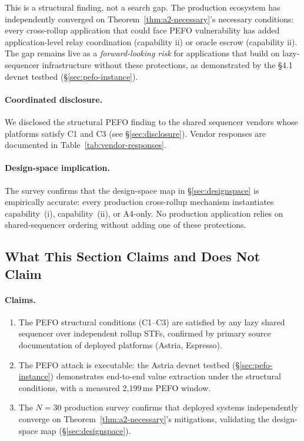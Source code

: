 This is a structural finding, not a search gap. The production ecosystem has
independently converged on Theorem~\ref{thm:a2-necessary}'s necessary
conditions: every cross-rollup application that could face PEFO vulnerability
has added application-level relay coordination (capability ii) or oracle
escrow (capability ii). The gap remains live as a \emph{forward-looking risk}
for applications that build on lazy-sequencer infrastructure without these
protections, as demonstrated by the §4.1 devnet testbed (\S\ref{sec:pefo-instance}).

\paragraph{Coordinated disclosure.}
We disclosed the structural PEFO finding to the shared sequencer vendors
whose platforms satisfy C1 and C3 (see \S\ref{sec:disclosure}). Vendor
responses are documented in Table~\ref{tab:vendor-responses}.

\paragraph{Design-space implication.}
The survey confirms that the design-space map in \S\ref{sec:designspace} is
empirically accurate: every production cross-rollup mechanism instantiates
capability~(i), capability~(ii), or A4-only. No production application
relies on shared-sequencer ordering without adding one of these protections.

\subsection{What This Section Claims and Does Not Claim}
\label{sec:pefo-scope}

\paragraph{Claims.}
\begin{enumerate}
  \item The PEFO structural conditions (C1--C3) are satisfied by any lazy
    shared sequencer over independent rollup STFs, confirmed by primary
    source documentation of deployed platforms (Astria, Espresso).
  \item The PEFO attack is executable: the Astria devnet testbed
    (\S\ref{sec:pefo-instance}) demonstrates end-to-end value extraction
    under the structural conditions, with a measured 2,199\,ms PEFO window.
  \item The $N=30$ production survey confirms that deployed systems
    independently converge on Theorem~\ref{thm:a2-necessary}'s mitigations,
    validating the design-space map (\S\ref{sec:designspace}).
\end{enumerate}

